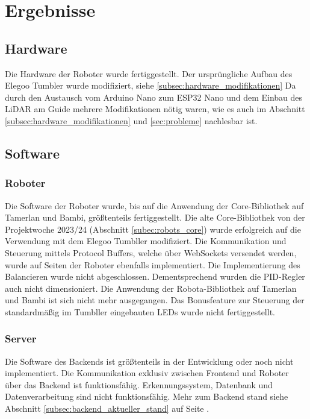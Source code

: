 \chapter{Ergebnisse}

\section{Hardware}
Die Hardware der Roboter wurde fertiggestellt.
Der ursprüngliche Aufbau des Elegoo Tumbler wurde modifiziert, siehe \ref{subsec:hardware_modifikationen}
Da durch den Austausch vom Arduino Nano zum ESP32 Nano und dem Einbau des LiDAR am Guide
mehrere Modifikationen nötig waren,
wie es auch im Abschnitt \ref{subsec:hardware_modifikationen} und \ref{sec:probleme} nachlesbar ist.

\section{Software}

\subsection{Roboter}
Die Software der Roboter wurde,
bis auf die Anwendung der Core-Bibliothek auf Tamerlan und Bambi,
größtenteils fertiggestellt.
%
Die alte Core-Bibliothek von der Projektwoche 2023/24 (Abschnitt \ref{subec:robots_core})
wurde erfolgreich auf die Verwendung mit dem Elegoo Tumbller modifiziert.
%
Die Kommunikation und Steuerung mittels Protocol Buffers,
welche über WebSockets versendet werden,
wurde auf Seiten der Roboter ebenfalls implementiert.
%
Die Implementierung des Balancieren wurde nicht abgeschlossen.
%
Dementsprechend wurden die PID-Regler auch nicht dimensioniert.
%
Die Anwendung der Robota-Bibliothek auf Tamerlan und Bambi ist sich nicht mehr ausgegangen.
%
Das Bonusfeature zur Steuerung der standardmäßig im Tumbller eingebauten LEDs wurde nicht fertiggestellt.

\subsection{Server}
Die Software des Backends ist größtenteils in der Entwicklung 
oder noch nicht implementiert.
% 
Die Kommunikation exklusiv zwischen Frontend und Roboter 
über das Backend ist funktionsfähig.
% 
Erkennungssystem, Datenbank und Datenverarbeitung sind nicht funktionsfähig.
% 
% 
Mehr zum Backend stand siehe Abschnitt \ref{subsec:backend_aktueller_stand} 
auf Seite \pageref{subsec:backend_aktueller_stand}.
% 

